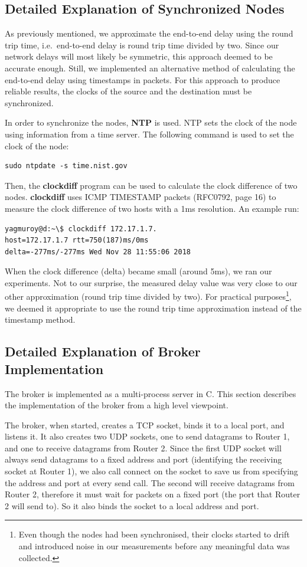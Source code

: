 \documentclass[conference]{IEEEtran}
\begin{document}
\subsection{Detailed Explanation of Synchronized Nodes}
As previously mentioned, we approximate the end-to-end delay using the round trip time, i.e.\
end-to-end delay is round trip time divided by two. Since our network delays will
most likely be symmetric, this approach deemed to be accurate enough. Still,
we implemented an alternative method of calculating the end-to-end delay using
timestamps in packets. For this approach to produce reliable results, the clocks
of the source and the destination must be synchronized.

In order to synchronize the nodes, \textbf{NTP} is used. NTP sets the clock of the
node using information from a time server. The following command is used to set the
clock of the node:
\begin{lstlisting}
sudo ntpdate -s time.nist.gov
\end{lstlisting}
Then, the \textbf{clockdiff} program can be used to calculate the clock difference
of two nodes. \textbf{clockdiff} uses ICMP TIMESTAMP packets (RFC0792, page 16)
to measure the clock difference of two hosts with a 1ms resolution. An example run:
\begin{lstlisting}
yagmuroy@d:~\$ clockdiff 172.17.1.7.
host=172.17.1.7 rtt=750(187)ms/0ms
delta=-277ms/-277ms Wed Nov 28 11:55:06 2018
\end{lstlisting}
When the clock difference (delta) became small (around 5ms), we ran our experiments.
Not to our surprise, the measured delay value was very close to our other approximation
(round trip time divided by two). For practical purposes\footnote{Even though the nodes had been
synchronised, their clocks started to drift and introduced noise in our measurements
before any meaningful data was collected.}, we deemed it appropriate
to use the round trip time approximation instead of the timestamp method.

\subsection{Detailed Explanation of Broker Implementation}
The broker is implemented as a multi-process server in C. This section describes
the implementation of the broker from a high level viewpoint.

The broker, when started, creates a TCP socket, binds it to a local port, and listens
it. It also creates two UDP sockets, one to send datagrams to Router 1, and one to receive
datagrams from Router 2. Since the first UDP socket will always send datagrams to a
fixed address and port (identifying the receiving socket at Router 1), we also
call connect on the socket to save us from specifying the address and port at every send call.
The second will receive datagrams from Router 2, therefore it must wait for packets
on a fixed port (the port that Router 2 will send to). So it also binds the socket
to a local address and port.
\end{document}
